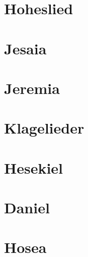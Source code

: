 \chapter{Hoheslied}
\begin{multicols}{2}
  \raggedcolumns
  \parskip=0pt \relax
  
\end{multicols}

\chapter{Jesaia}
\begin{multicols}{2}
  \raggedcolumns
  \parskip=0pt \relax
  
\end{multicols}

\chapter{Jeremia}
\begin{multicols}{2}
  \raggedcolumns
  \parskip=0pt \relax
  
\end{multicols}

\chapter{Klagelieder}
\begin{multicols}{2}
  \raggedcolumns
  \parskip=0pt \relax
  
\end{multicols}

\chapter{Hesekiel}
\begin{multicols}{2}
  \raggedcolumns
  \parskip=0pt \relax
  
\end{multicols}

\chapter{Daniel}
\begin{multicols}{2}
  \raggedcolumns
  \parskip=0pt \relax
  
\end{multicols}

\chapter{Hosea}
\begin{multicols}{2}
  \raggedcolumns
  \parskip=0pt \relax
  
\end{multicols}

